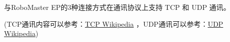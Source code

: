 
与RoboMaster EP的3种连接方式在通讯协议上支持 TCP 和 UDP 通讯。

(TCP通讯内容可以参考：\href{https://en.wikipedia.org/wiki/Transmission_Control_Protocol}{TCP Wikipedia} ，UDP通讯可以参考：\href{https://en.wikipedia.org/wiki/User_Datagram_Protocol}{UDP Wikipedia})

